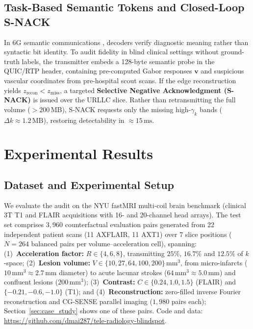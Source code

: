 \documentclass[conference]{IEEEtran}
\begin{document}
\subsection{Task-Based Semantic Tokens and Closed-Loop S-NACK}
In 6G semantic communications \cite{zhang2022semantic}, decoders verify diagnostic meaning rather than syntactic bit identity. To audit fidelity in blind clinical settings without ground-truth labels, the transmitter embeds a 128-byte semantic probe in the QUIC/RTP header, containing pre-computed Gabor responses $\mathbf{v}$ and suspicious vascular coordinates from pre-hospital scout scans. If the edge reconstruction yields $z_{\text{recon}} < z_{\text{miss}}$, a targeted \textbf{Selective Negative Acknowledgment (S-NACK)} is issued over the URLLC slice. Rather than retransmitting the full volume ($>200\,$MB), S-NACK requests only the missing high-$\gamma_k$ bands ($\Delta k \approx 1.2\,\text{MB}$), restoring detectability in $\approx 15\,\text{ms}$.

\section{Experimental Results}
\label{sec:results}

\subsection{Dataset and Experimental Setup}
We evaluate the audit on the NYU fastMRI multi-coil brain benchmark \cite{zbontar2018fastmri} (clinical 3T T1 and FLAIR acquisitions with 16- and 20-channel head arrays). The test set comprises $3{,}960$ counterfactual evaluation pairs generated from 22 independent patient scans (11 AXFLAIR, 11 AXT1) over 7 slice positions ($N=264$ balanced pairs per volume--acceleration cell), spanning: (1)~\textbf{Acceleration factor:} $R \in \{4, 6, 8\}$, transmitting $25\%$, $16.7\%$ and $12.5\%$ of $k$-space; (2)~\textbf{Lesion volume:} $V \in \{10, 27, 64, 100, 200\}\,\text{mm}^3$, from micro-infarcts ($10\,\text{mm}^3 \approx 2.7\,\text{mm}$ diameter) to acute lacunar strokes ($64\,\text{mm}^3 \approx 5.0\,\text{mm}$) and confluent lesions ($200\,\text{mm}^3$); (3)~\textbf{Contrast:} $C \in \{0.24, 1.0, 1.5\}$ (FLAIR) and $\{-0.21, -0.6, -1.0\}$ (T1); and (4)~\textbf{Reconstruction:} zero-filled inverse Fourier reconstruction and CG-SENSE parallel imaging \cite{pruessmann1999sense} ($1{,}980$ pairs each); Section~\ref{sec:case_study} shows one of these pairs. Code and data: \url{https://github.com/dmai287/tele-radiology-blindspot}.
\end{document}

